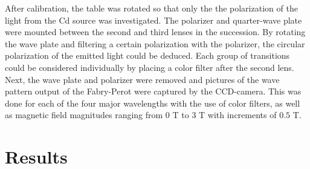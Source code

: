 \documentclass[12pt]{article}
\begin{document}
\noindent
After calibration, the table was rotated so that only the  the polarization of the light from the Cd source was investigated. The polarizer and quarter-wave plate were mounted between the second and third lenses in the succession. By rotating the wave plate and filtering a certain polarization with the polarizer, the circular polarization of the emitted light could be deduced. Each group of transitions could be considered individually by placing a color filter after the second lens.\\
\noindent
Next, the wave plate and polarizer were removed and pictures of the wave pattern output of the Fabry-Perot were captured by the CCD-camera. 
This was done for each of the four major wavelengths with the use of color filters, as well as magnetic field magnitudes ranging from $0$ T to $3$ T with increments of $0.5$ T.
\section{Results}
\end{document}
